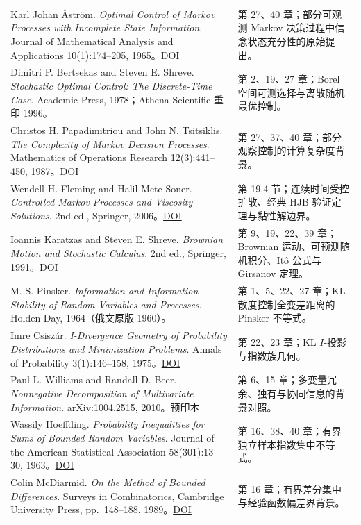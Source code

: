 \documentclass[
  11pt,
  oneside]{book}
\begin{document}
{\begin{longtable}[]{@{}
  >{\raggedright\arraybackslash}p{}
  >{\raggedright\arraybackslash}p{}@{}}
Karl Johan Åström. \emph{Optimal Control of Markov Processes with Incomplete State Information}. Journal of Mathematical Analysis and Applications 10(1):174--205, 1965。\href{https://doi.org/10.1016/0022-247X(65)90154-X}{DOI} & 第 27、40 章；部分可观测 Markov 决策过程中信念状态充分性的原始提出。 \\
Dimitri P. Bertsekas and Steven E. Shreve. \emph{Stochastic Optimal Control: The Discrete-Time Case}. Academic Press, 1978；Athena Scientific 重印 1996。 & 第 2、19、27 章；Borel 空间可测选择与离散随机最优控制。 \\
Christos H. Papadimitriou and John N. Tsitsiklis. \emph{The Complexity of Markov Decision Processes}. Mathematics of Operations Research 12(3):441--450, 1987。\href{https://doi.org/10.1287/moor.12.3.441}{DOI} & 第 27、37、40 章；部分观察控制的计算复杂度背景。 \\
Wendell H. Fleming and Halil Mete Soner. \emph{Controlled Markov Processes and Viscosity Solutions}. 2nd ed., Springer, 2006。\href{https://doi.org/10.1007/0-387-31071-1}{DOI} & 第 19.4 节；连续时间受控扩散、经典 HJB 验证定理与黏性解边界。 \\
Ioannis Karatzas and Steven E. Shreve. \emph{Brownian Motion and Stochastic Calculus}. 2nd ed., Springer, 1991。\href{https://doi.org/10.1007/978-1-4612-0949-2}{DOI} & 第 9、19、22、39 章；Brownian 运动、可预测随机积分、Itô 公式与 Girsanov 定理。 \\
M. S. Pinsker. \emph{Information and Information Stability of Random Variables and Processes}. Holden-Day, 1964（俄文原版 1960）。 & 第 1、5、22、27 章；KL 散度控制全变差距离的 Pinsker 不等式。 \\
Imre Csiszár. \emph{I-Divergence Geometry of Probability Distributions and Minimization Problems}. Annals of Probability 3(1):146--158, 1975。\href{https://doi.org/10.1214/aop/1176996454}{DOI} & 第 22、23 章；KL \(I\)-投影与指数族几何。 \\
Paul L. Williams and Randall D. Beer. \emph{Nonnegative Decomposition of Multivariate Information}. arXiv:1004.2515, 2010。\href{https://arxiv.org/abs/1004.2515}{预印本} & 第 6、15 章；多变量冗余、独有与协同信息的背景对照。 \\
Wassily Hoeffding. \emph{Probability Inequalities for Sums of Bounded Random Variables}. Journal of the American Statistical Association 58(301):13--30, 1963。\href{https://doi.org/10.1080/01621459.1963.10500830}{DOI} & 第 16、38、40 章；有界独立样本指数集中不等式。 \\
Colin McDiarmid. \emph{On the Method of Bounded Differences}. Surveys in Combinatorics, Cambridge University Press, pp.~148--188, 1989。\href{https://doi.org/10.1017/CBO9781107359949.008}{DOI} & 第 16 章；有界差分集中与经验函数偏差界背景。 \\

\end{longtable}}
\end{document}
